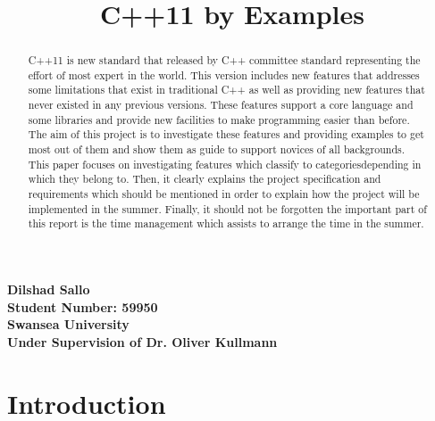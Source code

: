\documentclass[12pt]{report}
\title{C++11 by Examples}
\date{}
\begin{document}
\maketitle

\begin{center}
\textbf{Dilshad Sallo \\Student Number: 59950\\ Swansea University \\ Under Supervision of Dr. Oliver Kullmann}
\end{center}


\begin{abstract}
\label{Abstract}
C++11 is new standard that released by C++ committee standard representing the effort of most expert in the world. This version includes new features that addresses some limitations that exist in traditional C++ as well as providing new features that never existed in any previous versions. These features support a core language and some libraries and  provide new facilities  to make programming easier than before.\\
The aim of this project is to investigate these features and providing examples to get most out of them and show them as guide to support  novices of all backgrounds.\\
This paper focuses on investigating  features which classify to categories\linebreak depending in which they belong to. Then, it clearly explains the project  specification and requirements which should be mentioned in order to explain how the project will be implemented in the summer. Finally, it should not be forgotten the important part of this report is the time management which assists to arrange the time in the summer.
\end{abstract}

\tableofcontents


\chapter{Introduction}
\end{document}
